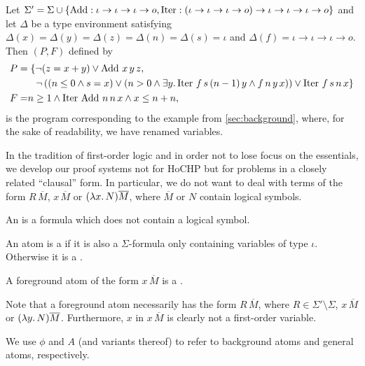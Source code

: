 \documentclass[a4paper,twoside,notitlepage,openright,11pt]{report}
\begin{document}


\begin{example}\label{ex:program} Let $\Sigma'=\Sigma\cup\{\operatorname{Add}:\iota\to\iota\to\iota\to o,\operatorname{Iter}:(\iota\to\iota\to\iota\to o)\to\iota\to\iota\to\iota\to o\}$ and let $\Delta$ be a type environment satisfying $\Delta(x)=\Delta(y)=\Delta(z)=\Delta(n)=\Delta(s)=\iota$ and $\Delta(f)=\iota\to\iota\to\iota\to o$. Then $(P,F)$ defined by
  \begin{align*}
    P=&\;\{\neg(z=x+y)\lor \operatorname{Add}\,x\,y\,z,\\
        &\;\;\;\neg\left((n\leq 0\land s=x)\lor (n>0\land\exists y\ldotp \operatorname{Iter}\,f\,s\,(n-1)\,y\land f\,n\,y\,x)\right) \lor \operatorname{Iter}\,f\,s\,n\,x\}\\
    F=&n\geq 1\land \operatorname{Iter}\,\operatorname{Add}\,n\,n\,x\land x\leq n+n,
  \end{align*}
  is the program corresponding to the example from \cref{sec:background}, where, for the sake of readability, we have renamed variables.
\end{example}

In the tradition of first-order logic and in order not to lose focus on the essentials, we develop our proof systems not for HoCHP but for problems in a closely related ``clausal'' form. In particular, we do not want to deal with terms of the form $R\,\overline M$, $x\,\overline M$ or $(\lambda x\ldotp N)\overline M$, where $\overline M$ or $N$ contain logical symbols.
\begin{definition}
  \begin{thmlist}
  \item An  is a formula which does not contain a logical symbol.
  \item An atom is a  if it is also a $\Sigma$-formula only containing variables of type $\iota$. Otherwise it is a .
  \item A foreground atom of the form $x\,\overline M$ is a .
  \end{thmlist}
\end{definition}
Note that a foreground atom necessarily has the form $R\,\overline M$, where $R\in\Sigma'\setminus\Sigma$, $x\,\overline M$ or $(\lambda y\ldotp N)\overline M$. Furthermore, $x$ in $x\,\overline M$ is clearly not a first-order variable.

We use $\phi$ and $A$ (and variants thereof) to refer to background atoms and general atoms, respectively.
\end{document}
